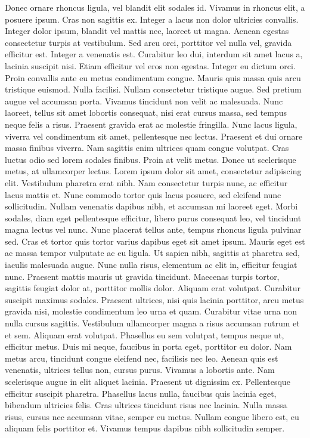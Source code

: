 \documentclass[a4paper]{memoir}
\begin{document}
Donec ornare rhoncus ligula, vel blandit elit sodales id. Vivamus in rhoncus elit, a posuere ipsum. Cras non sagittis ex. Integer a lacus non dolor ultricies convallis. Integer dolor ipsum, blandit vel mattis nec, laoreet ut magna. Aenean egestas consectetur turpis at vestibulum. Sed arcu orci, porttitor vel nulla vel, gravida efficitur est. Integer a venenatis est. Curabitur leo dui, interdum sit amet lacus a, lacinia suscipit nisi. Etiam efficitur vel eros non egestas. Integer eu dictum orci. Proin convallis ante eu metus condimentum congue. Mauris quis massa quis arcu tristique euismod. Nulla facilisi. Nullam consectetur tristique augue.
Sed pretium augue vel accumsan porta. Vivamus tincidunt non velit ac malesuada. Nunc laoreet, tellus sit amet lobortis consequat, nisi erat cursus massa, sed tempus neque felis a risus. Praesent gravida erat ac molestie fringilla. Nunc lacus ligula, viverra vel condimentum sit amet, pellentesque nec lectus. Praesent et dui ornare massa finibus viverra. Nam sagittis enim ultrices quam congue volutpat. Cras luctus odio sed lorem sodales finibus. Proin at velit metus. Donec ut scelerisque metus, at ullamcorper lectus.
Lorem ipsum dolor sit amet, consectetur adipiscing elit. Vestibulum pharetra erat nibh. Nam consectetur turpis nunc, ac efficitur lacus mattis et. Nunc commodo tortor quis lacus posuere, sed eleifend nunc sollicitudin. Nullam venenatis dapibus nibh, et accumsan mi laoreet eget. Morbi sodales, diam eget pellentesque efficitur, libero purus consequat leo, vel tincidunt magna lectus vel nunc. Nunc placerat tellus ante, tempus rhoncus ligula pulvinar sed. Cras et tortor quis tortor varius dapibus eget sit amet ipsum. Mauris eget est ac massa tempor vulputate ac eu ligula.
Ut sapien nibh, sagittis at pharetra sed, iaculis malesuada augue. Nunc nulla risus, elementum ac elit in, efficitur feugiat nunc. Praesent mattis mauris ut gravida tincidunt. Maecenas turpis tortor, sagittis feugiat dolor at, porttitor mollis dolor. Aliquam erat volutpat. Curabitur suscipit maximus sodales. Praesent ultrices, nisi quis lacinia porttitor, arcu metus gravida nisi, molestie condimentum leo urna et quam.
Curabitur vitae urna non nulla cursus sagittis. Vestibulum ullamcorper magna a risus accumsan rutrum et et sem. Aliquam erat volutpat. Phasellus eu sem volutpat, tempus neque ut, efficitur metus. Duis mi neque, faucibus in porta eget, porttitor eu dolor. Nam metus arcu, tincidunt congue eleifend nec, facilisis nec leo. Aenean quis est venenatis, ultrices tellus non, cursus purus. Vivamus a lobortis ante. Nam scelerisque augue in elit aliquet lacinia. Praesent ut dignissim ex. Pellentesque efficitur suscipit pharetra. Phasellus lacus nulla, faucibus quis lacinia eget, bibendum ultricies felis. Cras ultrices tincidunt risus nec lacinia. Nulla massa risus, cursus nec accumsan vitae, semper eu metus. Nullam congue libero est, eu aliquam felis porttitor et. Vivamus tempus dapibus nibh sollicitudin semper.
\end{document}
